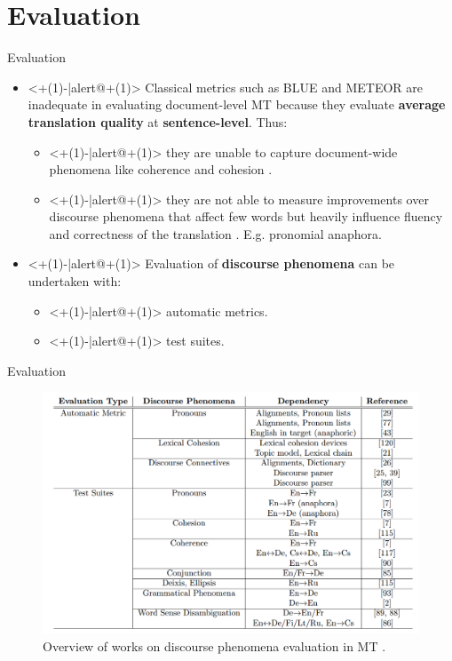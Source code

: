 \section{Evaluation}

\begin{frame}{Evaluation}	
	\begin{itemize}
		\item<+(1)-|alert@+(1)> Classical metrics such as BLUE and METEOR are inadequate in evaluating document-level MT because they evaluate \textbf{average translation quality} at \textbf{sentence-level}. Thus:
		\begin{itemize}
			\item<+(1)-|alert@+(1)> they are unable to capture document-wide phenomena like coherence and cohesion \cite{wong_extending_2012}.
			\item<+(1)-|alert@+(1)> they are not able to measure improvements over discourse phenomena that affect few words but heavily influence fluency and correctness of the translation \cite{muller_large-scale_2018}. E.g. pronomial anaphora.
		\end{itemize}
		\item<+(1)-|alert@+(1)> Evaluation of \textbf{discourse phenomena} can be undertaken with:
			\begin{itemize}
				\item<+(1)-|alert@+(1)> automatic metrics.
				\item<+(1)-|alert@+(1)> test suites.
			\end{itemize}
	\end{itemize}
\end{frame}

\begin{frame}{Evaluation}	
	\begin{figure}
		\centering
		\includegraphics[width=0.7\linewidth]{Images/maruf_2019_discourse_phenomena}
		\caption{Overview of works on discourse phenomena evaluation in MT \cite{maruf_survey_2019}.}
			\label{fig:maruf2019discoursephenomena}
	\end{figure}	
\end{frame}

